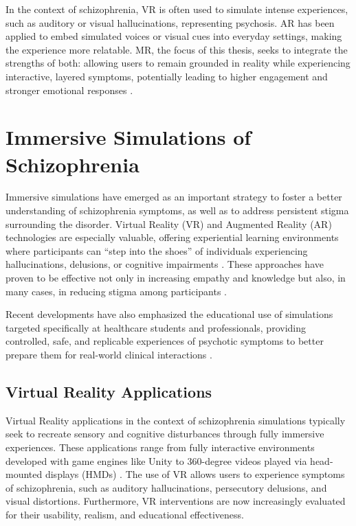 In the context of schizophrenia, VR is often used to simulate intense experiences, such as auditory or visual hallucinations, representing psychosis. AR has been applied to embed simulated voices or visual cues into everyday settings, making the experience more relatable. MR, the focus of this thesis, seeks to integrate the strengths of both: allowing users to remain grounded in reality while experiencing interactive, layered symptoms, potentially leading to higher engagement and stronger emotional responses \cite{Krogmeier2024, Silva2017, Zare-Bidaki2022}.

\section{Immersive Simulations of Schizophrenia}
Immersive simulations have emerged as an important strategy to foster a better understanding of schizophrenia symptoms, as well as to address persistent stigma surrounding the disorder. Virtual Reality (VR) and Augmented Reality (AR) technologies are especially valuable, offering experiential learning environments where participants can “step into the shoes” of individuals experiencing hallucinations, delusions, or cognitive impairments \cite{Krogmeier2024}. These approaches have proven to be effective not only in increasing empathy and knowledge but also, in many cases, in reducing stigma among participants \cite{Krogmeier2024,Holopainen2023}.

\vspace{1em}

Recent developments have also emphasized the educational use of simulations targeted specifically at healthcare students and professionals, providing controlled, safe, and replicable experiences of psychotic symptoms to better prepare them for real-world clinical interactions \cite{Yoo2020,Lee2020}.

\subsection{Virtual Reality Applications}
Virtual Reality applications in the context of schizophrenia simulations typically seek to recreate sensory and cognitive disturbances through fully immersive experiences. These applications range from fully interactive environments developed with game engines like Unity to 360-degree videos played via head-mounted displays (HMDs) \cite{Yoo2020,Lee2020}. The use of VR allows users to experience symptoms of schizophrenia, such as auditory hallucinations, persecutory delusions, and visual distortions. Furthermore, VR interventions are now increasingly evaluated for their usability, realism, and educational effectiveness.

